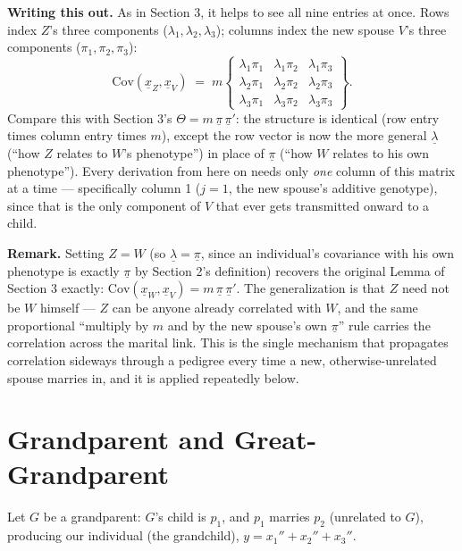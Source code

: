 \documentclass[12pt]{article}
\begin{document}
\textbf{Writing this out.} As in Section 3, it helps to see all nine entries at once. Rows index $Z$'s three components ($\lambda_1,\lambda_2,\lambda_3$); columns index the new spouse $V$'s three components ($\pi_1,\pi_2,\pi_3$):
\begin{equation*}
\mathrm{Cov}(\underline x_Z,\underline x_V) \;=\;
m\left\{\begin{array}{ccc}
\lambda_1\pi_1 & \lambda_1\pi_2 & \lambda_1\pi_3 \\
\lambda_2\pi_1 & \lambda_2\pi_2 & \lambda_2\pi_3 \\
\lambda_3\pi_1 & \lambda_3\pi_2 & \lambda_3\pi_3
\end{array}\right\} .
\end{equation*}
Compare this with Section 3's $\Theta=m\,\underline\pi\,\underline\pi'$: the structure is identical (row entry times column entry times $m$), except the row vector is now the more general $\underline\lambda$ (``how $Z$ relates to $W$'s phenotype'') in place of $\underline\pi$ (``how $W$ relates to his own phenotype''). Every derivation from here on needs only \emph{one} column of this matrix at a time — specifically column 1 ($j=1$, the new spouse's additive genotype), since that is the only component of $V$ that ever gets transmitted onward to a child.

\textbf{Remark.} Setting $Z=W$ (so $\underline\lambda=\underline\pi$, since an individual's covariance with his own phenotype is exactly $\underline\pi$ by Section 2's definition) recovers the original Lemma of Section 3 exactly: $\mathrm{Cov}(\underline x_W,\underline x_V)=m\,\underline\pi\,\underline\pi'$. The generalization is that $Z$ need not be $W$ himself — $Z$ can be anyone already correlated with $W$, and the same proportional ``multiply by $m$ and by the new spouse's own $\underline\pi$'' rule carries the correlation across the marital link. This is the single mechanism that propagates correlation sideways through a pedigree every time a new, otherwise-unrelated spouse marries in, and it is applied repeatedly below.

\section{Grandparent and Great-Grandparent}

Let $G$ be a grandparent: $G$'s child is $p_1$, and $p_1$ marries $p_2$ (unrelated to $G$), producing our individual (the grandchild), $y=x_1''+x_2''+x_3''$.
\end{document}
